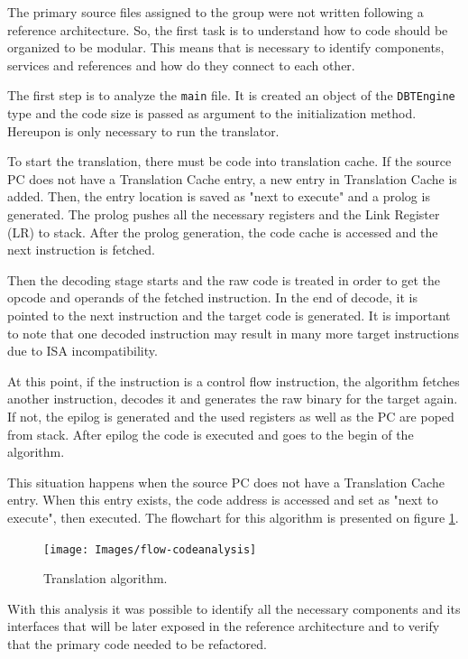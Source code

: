 \documentclass{report}
\begin{document}
	\par The primary source files assigned to the group were not written following a reference architecture. So, the first task is to understand how to code should be organized to be modular. This means that is necessary to identify components, services and references and how do they connect to each other.
	\par The first step is to analyze the \texttt{main} file. It is created an object of the \texttt{DBTEngine} type and the code size is passed as argument to the initialization method. Hereupon is only necessary to run the translator.
	\par To start the translation, there must be code into translation cache. If the source PC does not have a Translation Cache entry, a new entry in Translation Cache is added. Then, the entry location is saved as "next to execute" and a prolog is generated. The prolog pushes all the necessary registers and the Link Register (LR) to stack. After the prolog generation, the code cache is accessed and the next instruction is fetched. 
	\par Then the decoding stage starts and the raw code is treated in order to get the opcode and operands of the fetched instruction. In the end of decode, it is pointed to the next instruction and the target code is generated. It is important to note that one decoded instruction may result in many more target instructions due to ISA incompatibility. 
	\par At this point, if the instruction is a control flow instruction, the algorithm fetches another instruction, decodes it and generates the raw binary for the target again. If not, the epilog is generated and the used registers as well as the PC are poped from stack. After epilog the code is executed and goes to the begin of the algorithm.
	\par This situation happens when the source PC does not have a Translation Cache entry. When this entry exists, the code address is accessed and set as "next to execute", then executed. The flowchart for this algorithm is presented on figure \ref{fig:flowchart-codeanalysis}.
	
	\begin{figure} [H]
		\centering
		\texttt{[image: Images/flow-codeanalysis]}
		\caption{Translation algorithm.}
		\label{fig:flowchart-codeanalysis}
	\end{figure}	
	
	\par With this analysis it was possible to identify all the necessary components and its interfaces that will be later exposed in the reference architecture and to verify that the primary code needed to be refactored.
\end{document}
